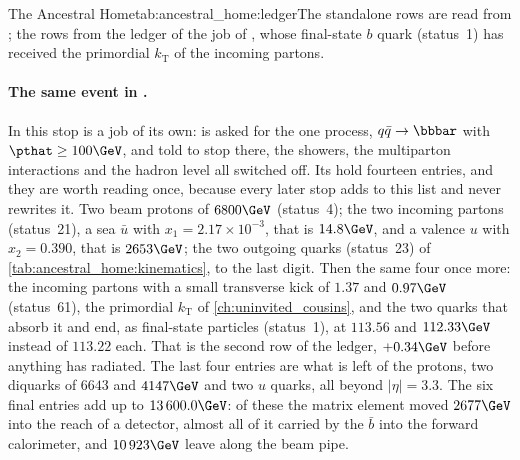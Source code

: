 \begin{ledgerboth}{The Ancestral Home}{tab:ancestral_home:ledger}{The
standalone rows are read from ; the \CMSSW
rows from the ledger of the  job of , whose
final-state $b$ quark (status~1) has received the primordial
$k_{\mathrm{T}}$ of the incoming partons.}
\end{ledgerboth}

\paragraph{The same event in \CMSSW.}
\label{sec:ancestral_home:cmssw_event}
In \CMSSW this stop is a job of its own: \PYTHIA is asked for the one
process, $q\bar q\to\bbbar$ with $\pthat\ge100\GeV$, and told to stop
there, the showers, the multiparton interactions and the hadron level all
switched off. Its  hold fourteen entries, and they are
worth reading once, because every later stop adds to this list and never
rewrites it. Two beam protons of $6800\GeV$ (status~4); the two incoming
partons (status~21), a sea $\bar u$ with $x_1=2.17\times10^{-3}$, that is
$14.8\GeV$, and a valence $u$ with $x_2=0.390$, that is $2653\GeV$; the
two outgoing quarks (status~23) of \cref{tab:ancestral_home:kinematics},
to the last digit. Then the same four once more: the incoming partons with
a small transverse kick of $1.37$ and $0.97\GeV$ (status~61), the
primordial $k_{\mathrm{T}}$ of \cref{ch:uninvited_cousins}, and the two
quarks that absorb it and end, as final-state particles (status~1), at
$113.56$ and $112.33\GeV$ instead of $113.22$ each. That is the second
\CMSSW row of the ledger, $+0.34\GeV$ before anything has radiated. The
last four entries are what is left of the protons, two diquarks of $6643$
and $4147\GeV$ and two $u$ quarks, all beyond $|\eta|=3.3$. The six final
entries add up to $13\,600.0\GeV$: of these the matrix element moved
$2677\GeV$ into the reach of a detector, almost all of it carried by the
$\bar b$ into the forward calorimeter, and $10\,923\GeV$ leave along the
beam pipe.


